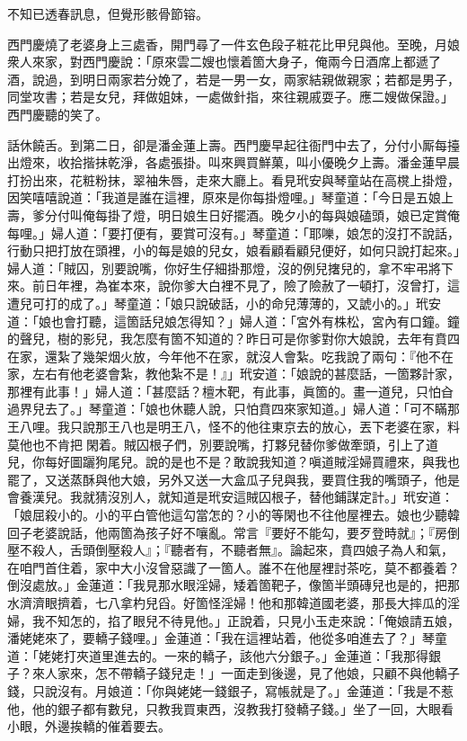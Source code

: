 \begin{myquote}
不知已透春訊息，但覺形骸骨節镕。
\end{myquote}

西門慶燒了老婆身上三處香，開門尋了一件玄色段子粧花比甲兒與他。至晚，月娘衆人來家，對西門慶說：「原來雲二嫂也懷着箇大身子，俺兩今日酒席上都遞了酒，說過，到明日兩家若分娩了，若是一男一女，兩家結親做親家；若都是男子，同堂攻書；若是女兒，拜做姐妹，一處做針指，來往親戚耍子。應二嫂做保證。」西門慶聽的笑了。

話休饒舌。到第二日，卻是潘金蓮上壽。西門慶早起往衙門中去了，分付小厮每擡出燈來，收拾揩抹乾淨，各處張掛。叫來興買鮮菓，叫小優晚夕上壽。潘金蓮早晨打扮出來，花粧粉抹，翠袖朱唇，走來大廳上。看見玳安與琴童站在高櫈上掛燈，因笑嘻嘻說道：「我道是誰在這裡，原來是你每掛燈哩。」琴童道：「今日是五娘上壽，爹分付叫俺每掛了燈，明日娘生日好擺酒。晚夕小的每與娘磕頭，娘已定賞俺每哩。」婦人道：「要打便有，要賞可沒有。」琴童道：「耶嚛，娘怎的沒打不說話，行動只把打放在頭裡，小的每是娘的兒女，娘看顧看顧兒便好，如何只說打起來。」婦人道：「賊囚，別要說嘴，你好生仔細掛那燈，沒的例兒撦兒的，拿不牢弔將下來。前日年裡，為崔本來，說你爹大白裡不見了，險了險赦了一頓打，沒曾打，這遭兒可打的成了。」琴童道：「娘只說破話，小的命兒薄薄的，又諕小的。」{}玳安道：「娘也會打聽，這箇話兒娘怎得知？」婦人道：「宮外有株松，宮內有口鐘。鐘的聲兒，樹的影兒，我怎麼有箇不知道的？昨日可是你爹對你大娘說，去年有賁四在家，還紮了幾架烟火放，今年他不在家，就沒人會紮。吃我說了兩句：『他不在家，左右有他老婆會紮，教他紮不是！』」{}玳安道：「娘說的甚麼話，一箇夥計家，那裡有此事！」婦人道：「甚麼話？檀木靶，有此事，眞箇的。畫一道兒，只怕㒲過界兒去了。」琴童道：「娘也休聽人說，只怕賁四來家知道。」婦人道：「可不瞞那王八哩。我只說那王八也是明王八，怪不的他往東京去的放心，丟下老婆在家，料莫他也不肯把𣭈閑着。賊囚根子們，別要說嘴，打夥兒替你爹做牽頭，引上了道兒，你每好圖躧狗尾兒。說的是也不是？敢說我知道？嗔道賊淫婦買禮來，與我也罷了，又送蒸酥與他大娘，另外又送一大盒瓜子兒與我，要買住我的嘴頭子，他是會養漢兒。我就猜沒別人，就知道是玳安這賊囚根子，替他鋪謀定計。」玳安道：「娘屈殺小的。小的平白管他這勾當怎的？小的等閑也不往他屋裡去。娘也少聽韓回子老婆說話，他兩箇為孩子好不嚷亂。常言『要好不能勾，要歹登時就』；『房倒壓不殺人，舌頭倒壓殺人』；『聽者有，不聽者無』。論起來，賁四娘子為人和氣，在咱門首住着，家中大小沒曾惡識了一箇人。誰不在他屋裡討茶吃，莫不都養着？倒沒處放。」金蓮道：「我見那水眼淫婦，矮着箇靶子，像箇半頭磚兒也是的，把那水濟濟眼擠着，七八拿杓兒舀。好箇怪淫婦！他和那韓道國老婆，那長大摔瓜的淫婦，我不知怎的，掐了眼兒不待見他。」{}正說着，只見小玉走來說：「俺娘請五娘，潘姥姥來了，要轎子錢哩。」金蓮道：「我在這裡站着，他從多咱進去了？」琴童道：「姥姥打夾道里進去的。一來的轎子，該他六分銀子。」金蓮道：「我那得銀子？來人家來，怎不帶轎子錢兒走！」一面走到後邊，見了他娘，只顧不與他轎子錢，只說沒有。{}月娘道：「你與姥姥一錢銀子，寫帳就是了。」金蓮道：「我是不惹他，他的銀子都有數兒，只教我買東西，沒教我打發轎子錢。」坐了一回，大眼看小眼，外邊挨轎的催着要去。

